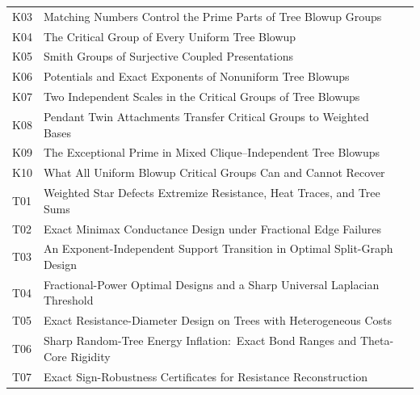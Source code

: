 \documentclass[11pt,a4paper]{article}
\theoremstyle{definition}\newtheorem{definition}[theorem]{Definition}
\theoremstyle{remark}\newtheorem{remark}[theorem]{Remark}
\numberwithin{equation}{section}
\begin{document}
\begin{longtable}{@{}p{}p{}r@{}}
K03 & Matching Numbers Control the Prime Parts of Tree Blowup Groups & \pageref{contrib-K03}\\

K04 & The Critical Group of Every Uniform Tree Blowup & \pageref{contrib-K04}\\

K05 & Smith Groups of Surjective Coupled Presentations & \pageref{contrib-K05}\\

K06 & Potentials and Exact Exponents of Nonuniform Tree Blowups & \pageref{contrib-K06}\\

K07 & Two Independent Scales in the Critical Groups of Tree Blowups & \pageref{contrib-K07}\\

K08 & Pendant Twin Attachments Transfer Critical Groups to Weighted Bases & \pageref{contrib-K08}\\

K09 & The Exceptional Prime in Mixed Clique--Independent Tree Blowups & \pageref{contrib-K09}\\

K10 & What All Uniform Blowup Critical Groups Can and Cannot Recover & \pageref{contrib-K10}\\

T01 & Weighted Star Defects Extremize Resistance, Heat Traces, and Tree Sums & \pageref{contrib-T01}\\

T02 & Exact Minimax Conductance Design under Fractional Edge Failures & \pageref{contrib-T02}\\

T03 & An Exponent-Independent Support Transition in Optimal Split-Graph Design & \pageref{contrib-T03}\\

T04 & Fractional-Power Optimal Designs and a Sharp Universal Laplacian Threshold & \pageref{contrib-T04}\\

T05 & Exact Resistance-Diameter Design on Trees with Heterogeneous Costs & \pageref{contrib-T05}\\

T06 & Sharp Random-Tree Energy Inflation:\ Exact Bond Ranges and Theta-Core Rigidity & \pageref{contrib-T06}\\

T07 & Exact Sign-Robustness Certificates for Resistance Reconstruction & \pageref{contrib-T07}\\


\end{longtable}
\end{document}
